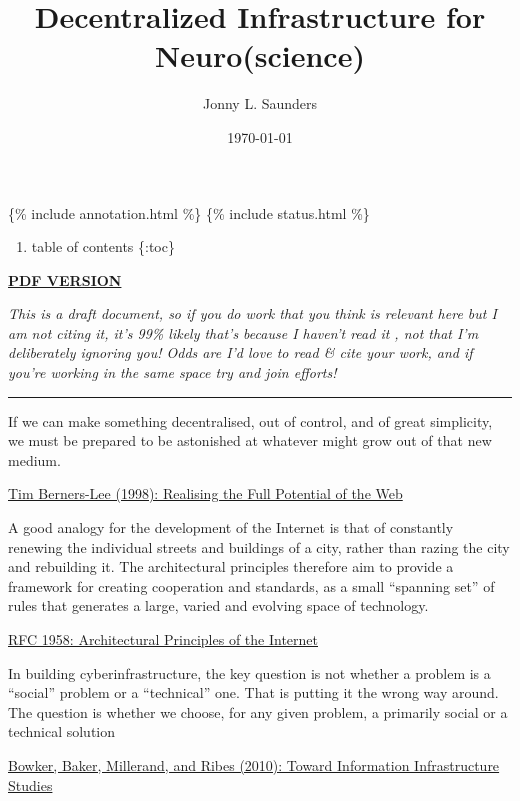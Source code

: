 \documentclass[10pt]{article}
\title{Decentralized Infrastructure for Neuro(science)}
\author{Jonny L. Saunders}
\date{\today}
\begin{document}
\maketitle
\tableofcontents
\pagebreak

\{\% include annotation.html \%\} \{\% include status.html \%\}

\begin{enumerate}
\def\labelenumi{\arabic{enumi}.}

\item
  table of contents \{:toc\}
\end{enumerate}

\href{https://jon-e.net/infrastructure/tex/decentralized_infrastructure_render.pdf}{\textbf{PDF
VERSION}}

\emph{This is a draft document, so if you do work that you think is
relevant here but I am not citing it, it's 99\% likely that's because I
haven't read it , not that I'm deliberately ignoring you! Odds are I'd
love to read \& cite your work, and if you're working in the same space
try and join efforts!}

\begin{center}\rule{0.5\linewidth}{0.5pt}\end{center}

\begin{leftbar}
If we can make something decentralised, out of control, and of great
simplicity, we must be prepared to be astonished at whatever might grow
out of that new medium.

\href{https://www.w3.org/1998/02/Potential.html}{Tim Berners-Lee (1998):
Realising the Full Potential of the Web}
\end{leftbar}

\begin{leftbar}
A good analogy for the development of the Internet is that of constantly
renewing the individual streets and buildings of a city, rather than
razing the city and rebuilding it. The architectural principles
therefore aim to provide a framework for creating cooperation and
standards, as a small ``spanning set'' of rules that generates a large,
varied and evolving space of technology.

\href{https://datatracker.ietf.org/doc/html/rfc1958}{RFC 1958:
Architectural Principles of the Internet}
\end{leftbar}

\begin{leftbar}
In building cyberinfrastructure, the key question is not whether a
problem is a ``social'' problem or a ``technical'' one. That is putting
it the wrong way around. The question is whether we choose, for any
given problem, a primarily social or a technical solution

\href{https://doi.org/10.1007/978-1-4020-9789-8_5}{Bowker, Baker,
Millerand, and Ribes (2010): Toward Information Infrastructure Studies}
\cite{bowkerInformationInfrastructureStudies2010} 
\end{leftbar}
\end{document}
